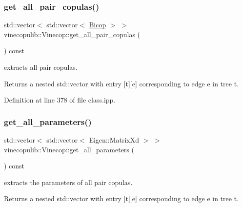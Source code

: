 \subsubsection{\texorpdfstring{get\+\_\+all\+\_\+pair\+\_\+copulas()}{get\_all\_pair\_copulas()}}
{\footnotesize\ttfamily std\+::vector$<$ std\+::vector$<$ \hyperlink{classvinecopulib_1_1_bicop}{Bicop} $>$ $>$ vinecopulib\+::\+Vinecop\+::get\+\_\+all\+\_\+pair\+\_\+copulas (\begin{DoxyParamCaption}{ }\end{DoxyParamCaption}) const\hspace{0.3cm}{\ttfamily [inline]}}



extracts all pair copulas. 

\begin{DoxyReturn}{Returns}
a nested std\+::vector with entry {\ttfamily \mbox{[}t\mbox{]}\mbox{[}e\mbox{]}} corresponding to edge {\ttfamily e} in tree {\ttfamily t}. 
\end{DoxyReturn}


Definition at line 378 of file class.\+ipp.

\mbox{\label{classvinecopulib_1_1_vinecop_adbd6c2e57666bcec101bc2cc8846c78b}} 
\subsubsection{\texorpdfstring{get\+\_\+all\+\_\+parameters()}{get\_all\_parameters()}}
{\footnotesize\ttfamily std\+::vector$<$ std\+::vector$<$ Eigen\+::\+Matrix\+Xd $>$ $>$ vinecopulib\+::\+Vinecop\+::get\+\_\+all\+\_\+parameters (\begin{DoxyParamCaption}{ }\end{DoxyParamCaption}) const\hspace{0.3cm}{\ttfamily [inline]}}



extracts the parameters of all pair copulas. 

\begin{DoxyReturn}{Returns}
a nested std\+::vector with entry {\ttfamily \mbox{[}t\mbox{]}\mbox{[}e\mbox{]}} corresponding to edge {\ttfamily e} in tree {\ttfamily t}. 
\end{DoxyReturn}


